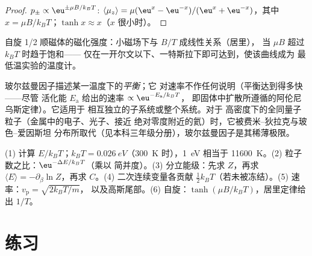 \begin{proof}
$p_\pm \propto\eu^{\pm\mu B/k_BT}$: $\langle\mu_z\rangle = \mu(\eu^x - \eu^{-x})/(\eu^x +
\eu^{-x})$，其中 $x = \mu B/k_BT$；$\tanh x \approx x$（$x$ 很小时）。
\end{proof}

\begin{omfigure}

{\small 自旋 1/2 顺磁体的磁化强度：小磁场下与 $B/T$ 成线性关系（居里），
当 $\mu B$ 超过 $k_BT$ 时趋于饱和——
仅在一开尔文以下、一特斯拉下即可达到，使该曲线成为
最低温实验的温度计。}
\end{omfigure}

\begin{remark}[该因子的局限]\label{rem:b2:boltzmann-factor:limits}
玻尔兹曼因子描述某一温度下的\emph{平衡}；它
对速率不作任何说明（平衡达到得多快——尽管
活化能 $E_{\text{a}}$ 给出的速率 $\propto\eu^{-E_{\text{a}}/k_BT}$，
即固体中扩散所遵循的阿伦尼乌斯定律）。它适用于
相互独立的子系统或整个系统。对于
高密度下的全同量子粒子（金属中的电子、光子、接近
绝对零度附近的氦）时，它被费米–狄拉克与玻色–爱因斯坦
分布所取代（见本科三年级分册），玻尔兹曼因子是其稀薄极限。
\end{remark}

\begin{method}[玻尔兹曼估算]\label{meth:b2:boltzmann-factor:method}
(1) 计算 $E/k_BT$；$k_BT = \qty{0.026}{eV}$（\qty{300}{K} 时），\qty{1}{eV}
相当于 \qty{11600}{K}。(2) 粒子数之比：$\eu^{-\Delta E/k_BT}$（乘以
简并度）。(3) 分立能级：先求 $Z$，再求 $\langle E\rangle =
-\partial_\beta\ln Z$，再求 $C$。(4) 二次连续变量各贡献
$\tfrac12k_BT$（若未被冻结）。(5) 速率：$v_{\text{p}} = \sqrt{2k_BT/m}$，
以及高斯尾部。(6) 自旋：$\tanh(\mu B/k_BT)$，居里定律给出 $1/T$。
\end{method}

\section{练习}

